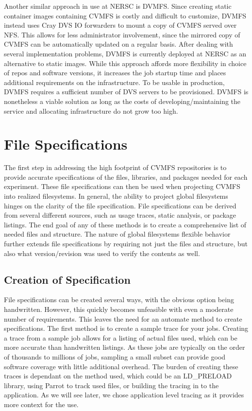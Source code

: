 \documentclass[conference]{IEEEtran}
\begin{document}
Another similar approach in use at NERSC is DVMFS.
Since creating static container images containing CVMFS is costly and difficult to customize,
DVMFS instead uses Cray DVS IO forwarders to mount a copy of CVMFS served over NFS.
This allows for less administrator involvement,
since the mirrored copy of CVMFS can be automatically updated on a regular basis.
After dealing with several implementation problems,
DVMFS is currently deployed at NERSC as an alternative to static images.
While this approach affords more flexibility in choice of repos and software versions,
it increases the job startup time and places additional requirements on the infrastructure.
To be usable in production, DVMFS requires a sufficient number of DVS servers to be provisioned.
DVMFS is nonetheless a viable solution as long as the costs of developing/maintaining the service and allocating infrastructure do not grow too high.

\section{File Specifications}

The first step in addressing the high footprint 
of CVMFS repositories is to provide accurate 
specifications of the files, libraries, and packages
needed for each experiment.
These file specifications can then be used when 
projecting CVMFS into realized filesystems.
In general, the ability to project global filesystems 
hinges on the clarity of the file specification.
File specifications can be derived from several
different sources, such as 
usage traces, static analysis, or package listings.
The end goal of any of these methods is to 
create a comprehensive list of needed files and structure.
The nature of global filesystems flexible behavior
further extends file specifications by requiring
not just the files and structure, but also what
version/revision was used to verify the contents as well.

\subsection{Creation of Specification}
File specifications can be created several ways,
with the obvious option being handwritten.
However, this quickly becomes unfeasible with
even a moderate number of requirements.
This leaves the need for an automate method to create
specifications.
The first method is to create a sample trace for your
jobs. 
Creating a trace from a sample job allows 
for a listing of actual files used, which
can be more accurate than handwritten listings.
As these jobs are typically on the order of thousands
to millions of jobs, sampling a small subset
can provide good software coverage with little
additional overhead. %
The burden of creating these traces is
dependant on the method used,
which could be an LD\_PRELOAD library,
using Parrot to track used files, %
or building the tracing in to the application.
As we will see later, we chose application
level tracing as it provides more context
for the use.
\end{document}
